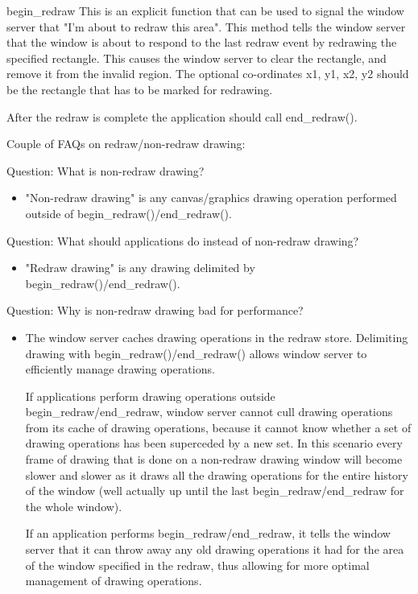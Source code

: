 \begin{methoddesc}[Canvas]{begin_redraw}{}
This is an explicit function that can be used to signal the window server that 
"I'm about to redraw this area". This method tells the window server that the 
window is about to respond to the last redraw event by redrawing the specified 
rectangle. This causes the window server to clear the rectangle, and remove it 
from the invalid region.
The optional co-ordinates x1, y1, x2, y2 should be the rectangle that has to be marked
for redrawing.

After the redraw is complete the application should call end_redraw().


Couple of FAQs on redraw/non-redraw drawing:

Question: What is non-redraw drawing?
\begin{itemize}
\item "Non-redraw drawing" is any canvas/graphics drawing operation performed 
outside of begin_redraw()/end_redraw().
\end{itemize}

Question: What should applications do instead of non-redraw drawing?
\begin{itemize}
\item "Redraw drawing" is any drawing delimited by begin_redraw()/end_redraw().
\end{itemize}

Question: Why is non-redraw drawing bad for performance?
\begin{itemize}
\item The window server caches drawing operations in the redraw store.
Delimiting drawing with begin_redraw()/end_redraw() allows window server to 
efficiently manage drawing operations. 

If applications perform drawing operations outside begin_redraw/end_redraw,
window server cannot cull drawing operations from its cache of drawing 
operations, because it cannot know whether a set of drawing operations has 
been superceded by a new set.
In this scenario every frame of drawing that is done on a non-redraw drawing window 
will become slower and slower as it draws all the drawing operations for the 
entire history of the window (well actually up until the last begin_redraw/end_redraw 
for the whole window).

If an application performs begin_redraw/end_redraw, it tells the window server 
that it can throw away any old drawing operations it had for the area of the 
window specified in the redraw, thus allowing for more optimal management of 
drawing operations.
\end{itemize}


\end{methoddesc}
